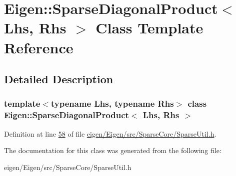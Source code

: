 \hypertarget{class_eigen_1_1_sparse_diagonal_product}{}\section{Eigen\+:\+:Sparse\+Diagonal\+Product$<$ Lhs, Rhs $>$ Class Template Reference}
\label{class_eigen_1_1_sparse_diagonal_product}


\subsection{Detailed Description}
\subsubsection*{template$<$typename Lhs, typename Rhs$>$\newline
class Eigen\+::\+Sparse\+Diagonal\+Product$<$ Lhs, Rhs $>$}



Definition at line \hyperlink{eigen_2_eigen_2src_2_sparse_core_2_sparse_util_8h_source_l00058}{58} of file \hyperlink{eigen_2_eigen_2src_2_sparse_core_2_sparse_util_8h_source}{eigen/\+Eigen/src/\+Sparse\+Core/\+Sparse\+Util.\+h}.



The documentation for this class was generated from the following file\+:\begin{DoxyCompactItemize}
\item 
eigen/\+Eigen/src/\+Sparse\+Core/\+Sparse\+Util.\+h\end{DoxyCompactItemize}
